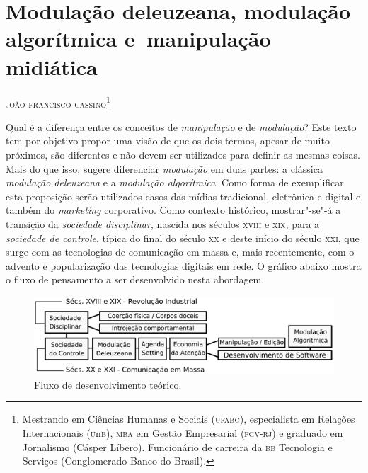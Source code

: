 \chapter{Modulação deleuzeana, modulação algorítmica e~manipulação midiática}

\begin{flushright}
\textsc{joão francisco cassino\footnote{Mestrando em Ciências Humanas e Sociais (\textsc{ufabc}), especialista em Relações Internacionais (\textsc{u}n\textsc{b}), \textsc{mba} em Gestão Empresarial (\textsc{fgv-rj}) e graduado em Jornalismo (Cásper Líbero). Funcionário de carreira da \textsc{bb} Tecnologia e Serviços (Conglomerado Banco do Brasil).}}
\end{flushright}

\setlength{\epigraphwidth}{.60\textwidth}
\begin{epigraphs} 

\end{epigraphs} 

\noindent{}Qual é a diferença entre os conceitos de \textit{manipulação} e de
\textit{modulação}? Este texto tem por objetivo propor uma visão de que os
dois termos, apesar de muito próximos, são diferentes e não devem ser
utilizados para definir as mesmas coisas. Mais do que isso, sugere
diferenciar \textit{modulação} em duas partes: a clássica \textit{modulação
deleuzeana} e a \textit{modulação algorítmica}. Como forma de exemplificar
esta proposição serão utilizados casos das mídias tradicional,
eletrônica e digital e também do \textit{marketing} corporativo. Como
contexto histórico, mostrar"-se"-á a transição da \textit{sociedade
disciplinar}, nascida nos séculos \textsc{xviii} e \textsc{xix}, para a \textit{sociedade de
controle}, típica do final do século \textsc{xx} e deste início do século \textsc{xxi},
que surge com as tecnologias de comunicação em massa e, mais
recentemente, com o advento e popularização das tecnologias digitais em
rede. O gráfico abaixo mostra o fluxo de pensamento a ser desenvolvido nesta
abordagem.

\begin{figure}[!ht]
\includegraphics[width=\textwidth]{./imgs/grafico1.png}
\caption{\formular\footnotesize{Fluxo de desenvolvimento teórico.}}
\end{figure}

